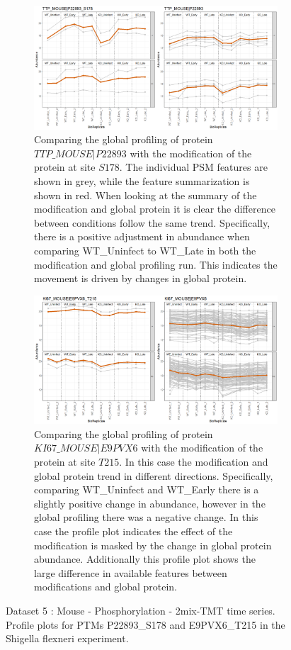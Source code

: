 \documentclass[mcp]{article}
\numberwithin{figure}{section} %
\numberwithin{table}{section}
\begin{document}
\begin{figure}[h!]
\centering
\begin{subfigure}{\textwidth}
 \centering
	\includegraphics[width=.95\textwidth]{images/No_Difference_Shigella_Profile_Plot}
	\caption{Comparing the global profiling of protein $TTP\_MOUSE|P22893$ with the modification of the protein at site $S178$. The individual PSM features are shown in grey, while the feature summarization is shown in red. When looking at the summary of the modification and global protein it is clear the difference between conditions follow the same trend. Specifically, there is a positive adjustment in abundance when comparing WT\_Uninfect to WT\_Late in both the modification and global profiling run. This indicates the movement is driven by changes in global protein.}
 \end{subfigure}\vspace{5mm}
 \begin{subfigure}{\textwidth}
 \centering
	\includegraphics[width=.95\textwidth]{images/Difference_Shigella_Profile_Plot}
	\caption{Comparing the global profiling of protein $KI67\_MOUSE|E9PVX6$ with the modification of the protein at site $T215$. In this case the modification and global protein trend in different directions. Specifically, comparing WT\_Uninfect and WT\_Early there is a slightly positive change in abundance, however in the global profiling there was a negative change. In this case the profile plot indicates the effect of the modification is masked by the change in global protein abundance. Additionally this profile plot shows the large difference in available features between modifications and global protein.}
 \end{subfigure}
\caption{Dataset 5 : Mouse - Phosphorylation - 2mix-TMT time series. Profile plots for PTMs P22893\_S178 and E9PVX6\_T215 in the Shigella flexneri experiment.}
\label{fig:shigella_profile}
\end{figure}
\end{document}
